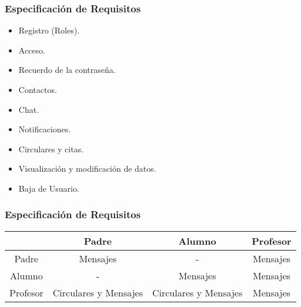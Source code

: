\begin{frame}
	\frametitle{Especificación de Requisitos}
		\begin{itemize}
			\item Registro (Roles).
			\item Acceso.
			\item Recuerdo de la contraseña.
			\item Contactos.
			\item Chat.
			\item Notificaciones.
			\item Circulares y citas.
			\item Visualización y modificación de datos.
			\item Baja de Usuario.
		\end{itemize}
	\endblock{}
\end{frame}


\begin{frame}
	\frametitle{Especificación de Requisitos}
		\begin{table} [!hbt]
			\begin{center}
				\begin{tabular}{|| c | c | c | c ||}
					\hline
					\hline
					& Padre & Alumno & Profesor \\
					\hline
					Padre & Mensajes & - & Mensajes \\
					\hline
					Alumno & - & Mensajes & Mensajes \\
					\hline
					Profesor & Circulares y Mensajes & Circulares y Mensajes & Mensajes \\
					\hline
					\hline
				\end{tabular}
			\end{center}
		\end{table}
	\endblock{}
\end{frame}